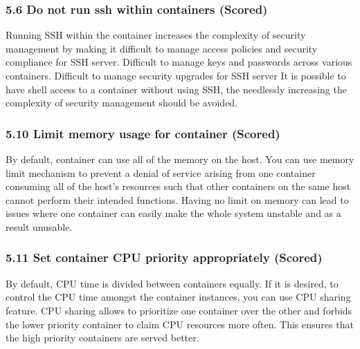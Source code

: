 \subsubsection*{5.6 Do not run ssh within containers (Scored)}Running SSH within the container increases the complexity of security management by
making it
difficult to manage access policies and security compliance for SSH server. Difficult to manage keys and passwords across various containers. Difficult to manage security upgrades for SSH server
It is possible to have shell access to a container without using SSH, the needlessly
increasing the complexity of security management should be avoided.



\subsubsection*{5.10 Limit memory usage for container (Scored)}
By default, container can use all of the memory on the host. You can use memory limit
mechanism to prevent a denial of service arising from one container consuming all of the
host’s resources such that other containers on the same host cannot perform their intended
functions. Having no limit on memory can lead to issues where one container can easily
make the whole system unstable and as a result unusable.

\subsubsection*{5.11 Set container CPU priority appropriately (Scored)}
By default, CPU time is divided between containers equally. If it is desired, to control the
CPU time amongst the container instances, you can use CPU sharing feature. CPU sharing
allows to prioritize one container over the other and forbids the lower priority container to
claim CPU resources more often. This ensures that the high priority containers are served
better.

